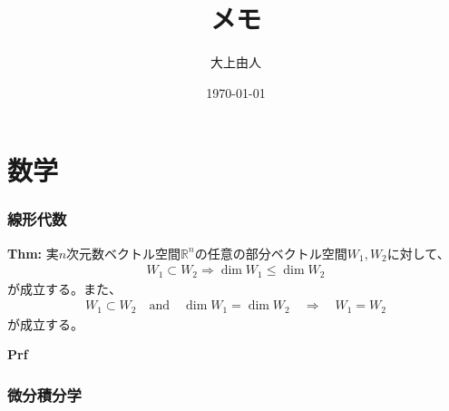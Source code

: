 \documentclass[a4paper,11pt]{jsarticle}
\numberwithin{equation}{section}
\begin{document}
\title{メモ}
\author{大上由人}
\date{\today}
\maketitle

\tableofcontents
\newpage

\part{数学}
\section{線形代数}

\begin{itembox}[l]{\textbf{Thm:}}
  実$n$次元数ベクトル空間$\mathbb{R}^n$の任意の部分ベクトル空間$W_1, W_2$に対して、
  \begin{align}
    W_1 \subset W_2 \Rightarrow \dim W_1 \leq \dim W_2
  \end{align}
  が成立する。また、
  \begin{align}
    W_1 \subset W_2 \quad \text{and} \quad \dim W_1 = \dim W_2 \quad \Rightarrow \quad W_1 = W_2
  \end{align}
  が成立する。
\end{itembox}
\textbf{Prf}\\

\section{微分積分学}
\end{document}
